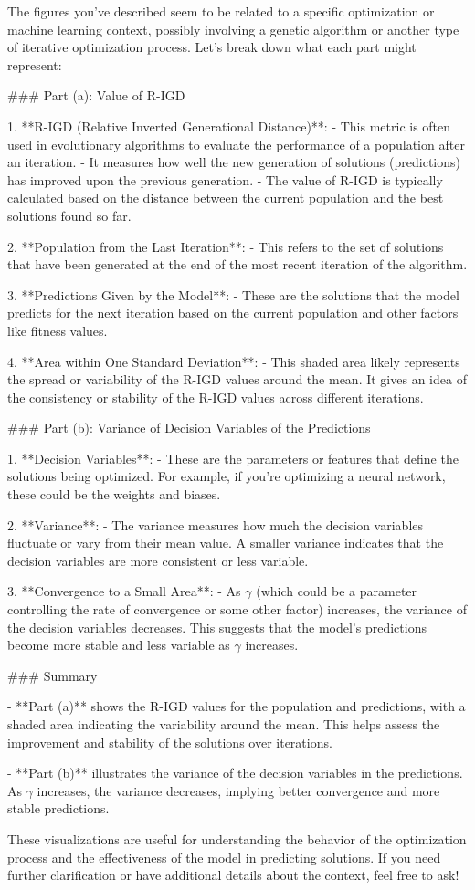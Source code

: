 The figures you've described seem to be related to a specific optimization or machine learning context, possibly involving a genetic algorithm or another type of iterative optimization process. Let's break down what each part might represent:

### Part (a): Value of R-IGD

1. **R-IGD (Relative Inverted Generational Distance)**:
   - This metric is often used in evolutionary algorithms to evaluate the performance of a population after an iteration.
   - It measures how well the new generation of solutions (predictions) has improved upon the previous generation.
   - The value of R-IGD is typically calculated based on the distance between the current population and the best solutions found so far.

2. **Population from the Last Iteration**:
   - This refers to the set of solutions that have been generated at the end of the most recent iteration of the algorithm.

3. **Predictions Given by the Model**:
   - These are the solutions that the model predicts for the next iteration based on the current population and other factors like fitness values.

4. **Area within One Standard Deviation**:
   - This shaded area likely represents the spread or variability of the R-IGD values around the mean. It gives an idea of the consistency or stability of the R-IGD values across different iterations.

### Part (b): Variance of Decision Variables of the Predictions

1. **Decision Variables**:
   - These are the parameters or features that define the solutions being optimized. For example, if you're optimizing a neural network, these could be the weights and biases.

2. **Variance**:
   - The variance measures how much the decision variables fluctuate or vary from their mean value. A smaller variance indicates that the decision variables are more consistent or less variable.

3. **Convergence to a Small Area**:
   - As \(\gamma\) (which could be a parameter controlling the rate of convergence or some other factor) increases, the variance of the decision variables decreases. This suggests that the model's predictions become more stable and less variable as \(\gamma\) increases.

### Summary

- **Part (a)** shows the R-IGD values for the population and predictions, with a shaded area indicating the variability around the mean. This helps assess the improvement and stability of the solutions over iterations.
  
- **Part (b)** illustrates the variance of the decision variables in the predictions. As \(\gamma\) increases, the variance decreases, implying better convergence and more stable predictions.

These visualizations are useful for understanding the behavior of the optimization process and the effectiveness of the model in predicting solutions. If you need further clarification or have additional details about the context, feel free to ask!